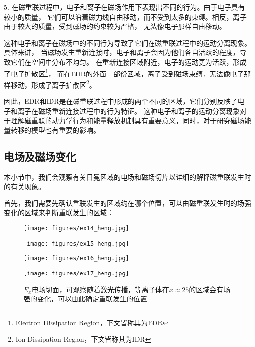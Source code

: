 5. 在磁重联过程中，电子和离子在磁场作用下表现出不同的行为。由于电子具有较小的质量，
它们可以沿着磁力线自由移动，而不受到太多的束缚。相反，离子由于较大的质量，受到磁场的约束较为严格，
无法像电子那样自由移动。\label{idredr1}

这种电子和离子在磁场中的不同行为导致了它们在磁重联过程中的运动分离现象。具体来讲，
当磁场发生重新连接时，电子和离子会因为他们各自活跃的程度，导致它们在空间中分布不均匀。
在重新连接区域附近，电子的运动更为活跃，形成了\cite{2016ASSL..427.....G}电子扩散区\footnote{Electron Dissipation Region，下文皆称其为EDR}，
而在EDR的外面一部份区域，离子受到磁场束缚，无法像电子那样移动，形成了\cite{2016ASSL..427.....G}离子扩散区\footnote{Ion Dissipation Region，下文皆称其为IDR}。

因此，EDR和IDR是在磁重联过程中形成的两个不同的区域，它们分别反映了电子和离子在磁场重新连接过程中的行为特征。
这种电子和离子的运动分离现象对于理解磁重联的动力学行为和能量释放机制具有重要意义，同时，对于研究磁场能量转移的模型也有重要的影响。

\subsection[\textnormal{电场及磁场变化}]{\textbf{电场及磁场变化}}

本小节中，我们会观察有关日冕区域的电场和磁场切片以详细的解释磁重联发生时的有关现象。\label{EB_field}

首先，我们需要先确认重联发生的区域约在哪个位置，可以由磁重联发生时的场强变化的区域来判断重联发生的区域：

\begin{figure}[H]
    \begin{minipage}[t]{0.5\linewidth}
        \centering
        \texttt{[image: figures/ex14\_heng.jpg]}
        \label{fig:sideEx:a}
    \end{minipage}%
    \begin{minipage}[t]{0.5\linewidth}
        \centering
        \texttt{[image: figures/ex15\_heng.jpg]}
        \label{fig:sideEx:b}
    \end{minipage}
    \begin{minipage}[t]{0.5\linewidth}
        \centering
        \texttt{[image: figures/ex16\_heng.jpg]}
        \label{fig:sideEx:c}
    \end{minipage}%
    \begin{minipage}[t]{0.5\linewidth}
        \centering
        \texttt{[image: figures/ex17\_heng.jpg]}
        \label{fig:sideEx:d}
    \end{minipage}
    \caption{$E_x$电场切面，可观察随着激光传播，等离子体在$x\approx 25$的区域会有场强的变化，可以由此确定重联发生的位置}
    \label{fig:combinedEx}

\end{figure}

